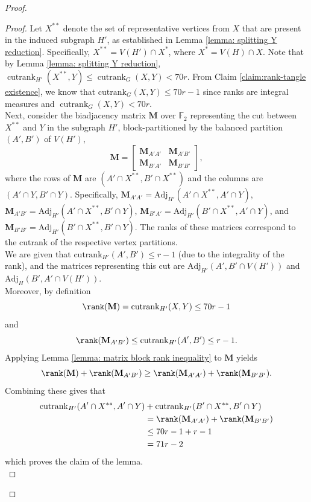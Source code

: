 \documentclass{article}
\theoremstyle{definition}
\begin{document}
\begin{proof}
    \begin{proof}Let $X^{**}$ denote the set of representative vertices from $X$ that are present in the induced subgraph $H'$, as established in Lemma \ref{lemma: splitting Y reduction}. Specifically, $X^{**} = V(H') \cap X^*$, where $X^* = V(H) \cap X$. Note that by Lemma \ref{lemma: splitting Y reduction}, $\operatorname{cutrank}_{H'}(X^{**}, Y)\leq \operatorname{cutrank}_G(X, Y) < 70r$.  From Claim \ref{claim:rank-tangle existence}, we know that $\mathrm{cutrank}_G(X,Y) \leq 70r - 1$ since ranks are integral measures and $\operatorname{cutrank}_G(X,Y)<70r$. \\

Next, consider the biadjacency matrix $\mathbf{M}$ over $\mathbb{F}_2$ representing the cut between $X^{**}$ and $Y$ in the subgraph $H'$, block-partitioned by the balanced partition $(A',B')$ of $V(H')$,
\[
\mathbf{M} = \begin{bmatrix}
\mathbf{M}_{A'A'} & \mathbf{M}_{A'B'} \\
\mathbf{M}_{B'A'} & \mathbf{M}_{B'B'}
\end{bmatrix},
\]
where the rows of $\mathbf{M}$ are $(A'\cap X^{**}, B'\cap X^{**})$ and the columns are $(A'\cap Y, B'\cap Y)$. Specifically, $\mathbf{M}_{A'A'} = \mathrm{Adj}_{H'}(A' \cap X^{**}, A' \cap Y)$, $\mathbf{M}_{A'B'} = \mathrm{Adj}_{H'}(A' \cap X^{**}, B' \cap Y)$,  $\mathbf{M}_{B'A'} = \mathrm{Adj}_{H'}(B' \cap X^{**}, A' \cap Y)$, and $\mathbf{M}_{B'B'} = \mathrm{Adj}_{H'}(B' \cap X^{**}, B' \cap Y)$. The ranks of these matrices correspond to the cutrank of the respective vertex partitions. \\

We are given that $\mathrm{cutrank}_{H'}(A',B')\leq r-1$ (due to the integrality of the rank), and the matrices representing this cut are $\mathrm{Adj}_{H'}(A', B'\cap V(H'))$ and $\mathrm{Adj}_H(B', A'\cap V(H'))$. \\

Moreover, by definition
\[\rank(\mathbf{M}) = \operatorname{cutrank}_{H'}(X,Y) \leq 70r - 1\] and \[\rank(\mathbf{M}_{A'B'}) \leq \operatorname{cutrank}_{H'}(A',B') \leq r - 1.\]
Applying Lemma \ref{lemma: matrix block rank inequality} to $\mathbf{M}$ yields
\[\rank(\mathbf{M}) + \rank(\mathbf{M}_{A'B'}) \geq \rank(\mathbf{M}_{A'A'}) + \rank(\mathbf{M}_{B'B'}).\]
Combining these gives that
\begin{align*}\operatorname{cutrank}_{H'}(A'\cap X^{**}, A'\cap Y) &+ \operatorname{cutrank}_{H'}(B'\cap X^{**}, B'\cap Y) \\
&= \rank(\mathbf{M}_{A'A'}) + \rank(\mathbf{M}_{B'B'}) \\
&\leq 70r - 1 + r - 1 \\
&= 71r - 2
\end{align*}
which proves the claim of the lemma. 
\qedhere\\
\end{proof}


\end{proof}
\end{document}
